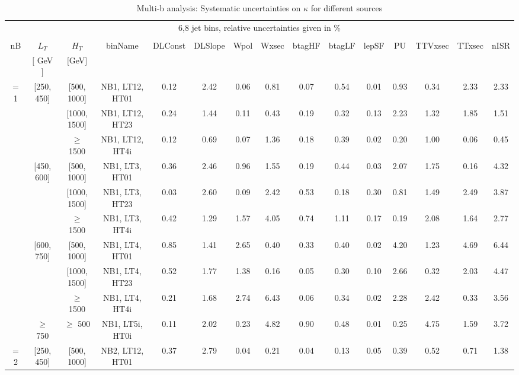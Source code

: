 \begin{table}[ht] 
 \tiny 
\caption{Multi-b analysis: Systematic uncertainties on $\kappa$ for different sources} 
\begin{center} 
\label{tab:sysTable} 
\begin{tabular}{|c | c | c | c | c | c | c | c | c | c | c | c | c | c | c | } 
\hline 
\multicolumn{15}{|c|}{6,8 jet bins, relative uncertainties given in \%} \\ 
\multicolumn{15}{|c|}{} \\ \hline 
nB &  $L_T$ & $H_T$ & binName & DLConst & DLSlope & Wpol & Wxsec & btagHF & btagLF & lepSF & PU & TTVxsec & TTxsec & nISR  \\ 
   & $[$ GeV $]$  &  $[$GeV$]$  &  &  &  &  &  &  &  &  &  &  &  &   \\ \hline 
\cline{1-15} $=$ 1 & [250, 450] & [500, 1000]&NB1, LT12, HT01 & 0.12 & 2.42 & 0.06 & 0.81 & 0.07 & 0.54 & 0.01 & 0.93 & 0.34 & 2.33 & 2.33 \\ 
\cline{3-15}  & & [1000, 1500] &NB1, LT12, HT23 & 0.24 & 1.44 & 0.11 & 0.43 & 0.19 & 0.32 & 0.13 & 2.23 & 1.32 & 1.85 & 1.51 \\ 
\cline{3-15}  & & $\geq$ 1500 &NB1, LT12, HT4i & 0.12 & 0.69 & 0.07 & 1.36 & 0.18 & 0.39 & 0.02 & 0.20 & 1.00 & 0.06 & 0.45 \\ 
\cline{2-15}   & [450, 600] & [500, 1000]&NB1, LT3, HT01 & 0.36 & 2.46 & 0.96 & 1.55 & 0.19 & 0.44 & 0.03 & 2.07 & 1.75 & 0.16 & 4.32 \\ 
\cline{3-15}  & & [1000, 1500] &NB1, LT3, HT23 & 0.03 & 2.60 & 0.09 & 2.42 & 0.53 & 0.18 & 0.30 & 0.81 & 1.49 & 2.49 & 3.87 \\ 
\cline{3-15}  & & $\geq$ 1500 &NB1, LT3, HT4i & 0.42 & 1.29 & 1.57 & 4.05 & 0.74 & 1.11 & 0.17 & 0.19 & 2.08 & 1.64 & 2.77 \\ 
\cline{2-15}   & [600, 750] & [500, 1000]&NB1, LT4, HT01 & 0.85 & 1.41 & 2.65 & 0.40 & 0.33 & 0.40 & 0.02 & 4.20 & 1.23 & 4.69 & 6.44 \\ 
\cline{3-15}  & & [1000, 1500] &NB1, LT4, HT23 & 0.52 & 1.77 & 1.38 & 0.16 & 0.05 & 0.30 & 0.10 & 2.66 & 0.32 & 2.03 & 4.47 \\ 
\cline{3-15}  & & $\geq$ 1500 &NB1, LT4, HT4i & 0.21 & 1.68 & 2.74 & 6.43 & 0.06 & 0.34 & 0.02 & 2.28 & 2.42 & 0.33 & 3.56 \\ 
\cline{2-15}   & $\geq$ 750 & $\geq$ 500&NB1, LT5i, HT0i & 0.11 & 2.02 & 0.23 & 4.82 & 0.90 & 0.48 & 0.01 & 0.25 & 4.75 & 1.59 & 3.72 \\ 
\cline{1-15} $=$ 2 & [250, 450] & [500, 1000]&NB2, LT12, HT01 & 0.37 & 2.79 & 0.04 & 0.21 & 0.04 & 0.13 & 0.05 & 0.39 & 0.52 & 0.71 & 1.38 \\ 

\end{tabular}
\end{center}
\end{table}
